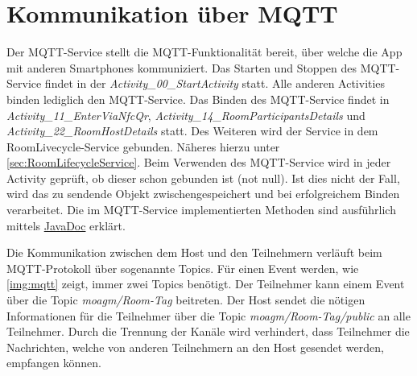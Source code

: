 \section{Kommunikation über MQTT}
\label{sec:MQTT Service}
Der MQTT-Service stellt die MQTT-Funktionalität bereit, über welche die App mit anderen Smartphones kommuniziert.
Das Starten und Stoppen des MQTT-Service findet in der \textit{Activity\_00\_StartActivity} statt. 
Alle anderen Activities binden lediglich den MQTT-Service. Das Binden des MQTT-Service findet in  \textit{Activity\_11\_EnterViaNfcQr}, \textit{Activity\_14\_RoomParticipantsDetails} und \textit{Activity\_22\_RoomHostDetails} statt. 
Des Weiteren wird der Service in dem RoomLivecycle-Service gebunden. 
Näheres hierzu unter \cref{sec:RoomLifecycleService}.  
Beim Verwenden des MQTT-Service wird in jeder Activity geprüft, ob dieser schon gebunden ist (not null). 
Ist dies nicht der Fall, wird das zu sendende Objekt zwischengespeichert und bei erfolgreichem Binden verarbeitet. 
Die im MQTT-Service implementierten Methoden sind ausführlich mittels \href{https://scm.inftech.hs-mannheim.de/gogs/moa/20moagm/src/dev/Doku/javadoc}{JavaDoc} erklärt. 

Die Kommunikation zwischen dem Host und den Teilnehmern verläuft beim MQTT-Protokoll über sogenannte Topics. 
Für einen Event werden, wie \cref{img:mqtt} zeigt, immer zwei Topics benötigt. 
Der Teilnehmer kann einem Event über die Topic \textit{moagm/Room-Tag} beitreten. 
Der Host sendet die nötigen Informationen für die Teilnehmer über die Topic \textit{moagm/Room-Tag/public} an alle Teilnehmer. 
Durch die Trennung der Kanäle wird verhindert, dass Teilnehmer die Nachrichten, welche von anderen Teilnehmern an den Host gesendet werden, empfangen können.

